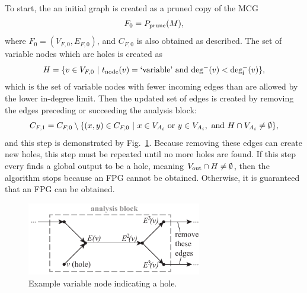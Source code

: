 \begin{description}
        To start, the an initial graph is created as a pruned copy of the MCG
        \begin{equation}
        F_0 = P_\textrm{prune}(M),
        \end{equation}
        where $F_0 = (V_{F,0},E_{F,0})$, and $C_{F,0}$ is also obtained as described. 
        The set of variable nodes which are holes is created as
        \begin{equation}
        H = \{v \in V_{F,0} \ | \  t_\textrm{node}(v) = \textrm{`variable'} \textrm{ and } \textrm{deg}^-(v) < \textrm{deg}_l^-(v) \},
        \end{equation}
        which is the set of variable nodes with fewer incoming edges than are allowed by the lower in-degree limit.
        Then the updated set of edges is created by removing the edges preceding or succeeding the analysis block:
        \begin{equation}
        C_{F,1} = C_{F,0} \setminus \{(x,y) \in C_{F,0} \ | \  x \in V_{A_i} \textrm{ or } y \in V_{A_i}, \textrm{ and } H\cap V_{A_i} \neq \emptyset \},
    \end{equation}
    and this step is demonstrated by Fig.~\ref{f:hole}. Because removing these edges can create new holes, this step must be repeated until no more holes are found.
        If this step every finds a global output to be a hole, meaning $V_\textrm{out} \cap H \neq \emptyset$, then the algorithm stops because an FPG cannot be obtained. 
        Otherwise, it is guaranteed that an FPG can be obtained.
    \begin{figure}[htb!]
        \begin{center}
        \includegraphics[width=3in]{images/analysis_block_hole}
        \end{center}
        \vspace{-20pt}
    \caption{Example variable node indicating a hole.}
    \label{f:hole}
    \end{figure}


\end{description}
